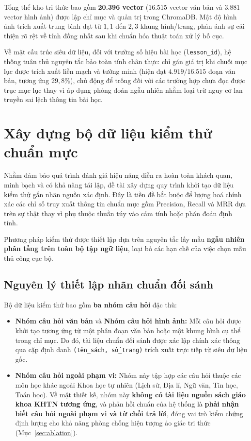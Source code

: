 Tổng thể kho tri thức bao gồm \textbf{20.396 vector} ($16.515$ vector văn bản và $3.881$ vector hình ảnh) được lập chỉ mục và quản trị trong ChromaDB. Mật độ hình ảnh trích xuất trung bình đạt từ $1{,}1$ đến $2{,}3$ khung hình/trang, phản ánh sự cải thiện rõ rệt về tính đồng nhất sau khi chuẩn hóa thuật toán xử lý bố cục.

Về mặt cấu trúc siêu dữ liệu, đối với trường số hiệu bài học (\texttt{lesson\_id}), hệ thống tuân thủ nguyên tắc bảo toàn tính chân thực: chỉ gán giá trị khi chuỗi mục lục được trích xuất liền mạch và tường minh (hiện đạt $4.919/16.515$ đoạn văn bản, tương ứng $29{,}8\%$), chủ động để trống đối với các trường hợp chưa đọc được trục mục lục thay vì áp dụng phỏng đoán ngẫu nhiên nhằm loại trừ nguy cơ lan truyền sai lệch thông tin bài học.

\section{Xây dựng bộ dữ liệu kiểm thử chuẩn mực}
\label{sec:testset}
Nhằm đảm bảo quá trình đánh giá hiệu năng diễn ra hoàn toàn khách quan, minh bạch và có khả năng tái lập, đề tài xây dựng quy trình khởi tạo dữ liệu kiểm thử gắn nhãn nguồn xác định. Đây là tiền đề bắt buộc để lượng hoá chính xác các chỉ số truy xuất thông tin chuẩn mực gồm Precision, Recall và MRR dựa trên sự thật thay vì phụ thuộc thuần túy vào cảm tính hoặc phán đoán định tính.

Phương pháp kiểm thử được thiết lập dựa trên nguyên tắc lấy mẫu \textbf{ngẫu nhiên phân tầng trên toàn bộ tập ngữ liệu}, loại bỏ các hạn chế của việc chọn mẫu thủ công cục bộ.

\subsection{Nguyên lý thiết lập nhãn chuẩn đối sánh}
Bộ dữ liệu kiểm thử bao gồm \textbf{ba nhóm câu hỏi} đặc thù:
\begin{itemize}
    \item \textbf{Nhóm câu hỏi văn bản} và \textbf{Nhóm câu hỏi hình ảnh:} Mỗi câu hỏi được khởi tạo tương ứng từ một phân đoạn văn bản hoặc một khung hình cụ thể trong chỉ mục. Do đó, tài liệu chuẩn đối sánh được xác lập chính xác thông qua cặp định danh \texttt{(tên\_sách, số\_trang)} trích xuất trực tiếp từ siêu dữ liệu gốc.
    \item \textbf{Nhóm câu hỏi ngoài phạm vi:} Nhóm này tập hợp các câu hỏi thuộc các môn học khác ngoài Khoa học tự nhiên (Lịch sử, Địa lí, Ngữ văn, Tin học, Toán học). Về mặt thiết kế, nhóm này \textbf{không có tài liệu nguồn sách giáo khoa KHTN tương ứng}, và phản hồi chuẩn của hệ thống là \textbf{phải nhận biết câu hỏi ngoài phạm vi và từ chối trả lời}, đóng vai trò kiểm chứng định lượng cho khả năng phòng chống hiện tượng ảo giác tri thức (Mục~\ref{sec:ablation}).
\end{itemize}

